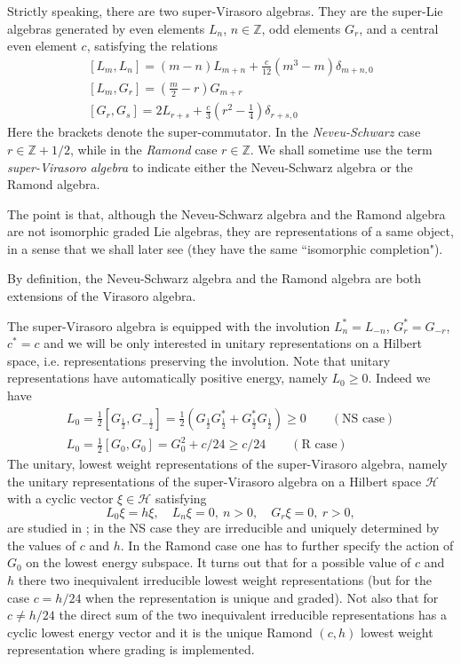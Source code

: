 \documentclass[11pt]{article}
\def\de{\delta}
\def\H{{\cal H}}
\def\H{{\mathcal H}}
\begin{document}
Strictly speaking, there are two super-Virasoro algebras. They are the super-Lie algebras generated by even 
elements $L_n$, $n\in\mathbb Z$, odd elements $G_r$, and a central even element $c$, 
satisfying the relations
\begin{gather}\label{svirdef}
    [L_m , L_n] = (m-n)L_{m+n} + \frac{c}{12}(m^3 - m)\de_{m+n, 0}\\
    \nonumber
    [L_m, G_r] = (\frac{m}{2} - r)G_{m+r}\\
    \nonumber
    [G_r, G_s] = 2L_{r+s} + \frac{c}{3}(r^2 - \frac14)\de_{r+s,0}
    \end{gather}
Here the brackets denote the super-commutator. 
In the \emph{Neveu-Schwarz} case $r\in\mathbb Z + 1/2$, while in the 
\emph{Ramond} case $r\in\mathbb Z$. We shall sometime use the term 
\emph{super-Virasoro algebra} to indicate either the Neveu-Schwarz 
algebra or the Ramond algebra. 

The point is that, although the Neveu-Schwarz algebra and the  Ramond algebra are not isomorphic graded Lie algebras, they are representations of a same object, in a sense that we shall later see (they have the same ``isomorphic completion").

By definition, the Neveu-Schwarz algebra and the Ramond algebra are both
extensions of the Virasoro algebra. 

The super-Virasoro algebra is equipped with the involution $L^*_n = 
L_{-n}$, $G^*_r = G_{-r}$, $c^* = c$ and we will be only interested in unitary 
representations on a Hilbert space,
i.e. representations preserving the involution. Note that unitary representations have automatically positive energy, namely $L_0\geq 0$. Indeed we have 
\begin{gather*}
  L_0 =  \frac12[G_{\frac12}, G_{-\frac12}] = \frac12\left(G_{\frac12}G_{\frac12}^* +
  G_{\frac12}^*G_{\frac12}\right)\geq 0\qquad (\text{NS case})\\
  L_0 =  \frac12[G_0, G_0] = G_0^2 + c/24 \geq c/24
\qquad (\text{R case})    
\end{gather*}
The unitary, lowest weight representations of the super-Virasoro 
algebra, namely the unitary representations of the super-Virasoro 
algebra on a Hilbert space $\H$ with a cyclic vector 
$\xi\in \H$ satisfying
\[
L_0\xi = h\xi, \quad L_n\xi = 0, \ n>0, \quad G_r\xi = 0,\ r>0,
\]
are studied in \cite{FQS,GKO}; in the NS case they are irreducible and uniquely determined 
by the values of $c$ and $h$. In the Ramond case one has to further specify the action of $G_0$ on the lowest energy subspace. It turns out that for a possible value of $c$ and $h$ there two inequivalent irreducible lowest weight representations (but for the case $c = h/24$ when the representation is unique and graded). Not also that for $c \neq h/24$ the direct sum of the two inequivalent irreducible representations has a cyclic lowest energy vector and it is the unique Ramond $(c,h)$ lowest weight representation where grading is implemented.
\end{document}
